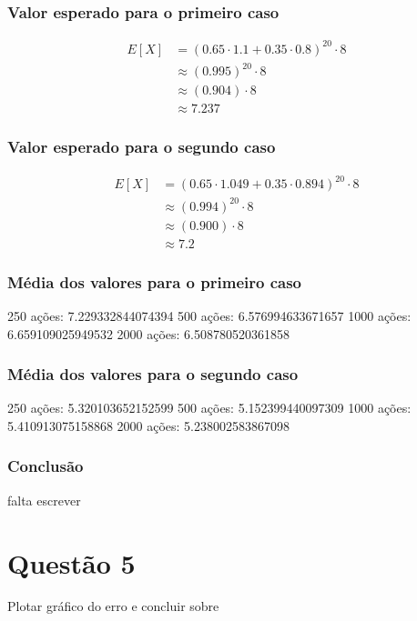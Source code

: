 \documentclass[
	11pt,				%
	openright,			%
	oneside,			%
	a4paper,			%
	english,			%
	french,				%
	spanish,			%
	brazil,				%
	]{abntex2}
\begin{document}
\subsection{Valor esperado para o primeiro caso}
\begin{align*}
  E[X] &= (0.65 \cdot 1.1 + 0.35 \cdot 0.8)^{20} \cdot 8\\
  &\approx (0.995)^{20} \cdot 8\\
  &\approx (0.904) \cdot 8\\
  &\approx 7.237
\end{align*}
\subsection{Valor esperado para o segundo caso}
\begin{align*}
  E[X] &= (0.65 \cdot 1.049 + 0.35 \cdot 0.894)^{20} \cdot 8\\
  &\approx (0.994)^{20} \cdot 8\\
  &\approx (0.900) \cdot 8\\
  &\approx 7.2
\end{align*}

\subsection{Média dos valores para o primeiro caso}
250 ações: 7.229332844074394
500 ações: 6.576994633671657
1000 ações: 6.659109025949532
2000 ações: 6.508780520361858

\subsection{Média dos valores para o segundo caso}
250 ações: 5.320103652152599
500 ações: 5.152399440097309
1000 ações: 5.410913075158868
2000 ações: 5.238002583867098

\subsection{Conclusão}
falta escrever

\chapter{Questão 5}
Plotar gráfico do erro e concluir sobre
\end{document}
